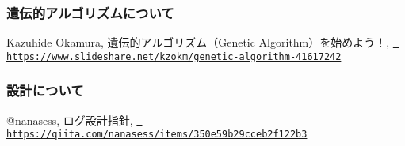 \subsubsection*{遺伝的アルゴリズムについて}

Kazuhide Okamura, 遺伝的アルゴリズム（\+Genetic Algorithm）を始めよう！, \href{https://www.slideshare.net/kzokm/genetic-algorithm-41617242}{\texttt{ https\+://www.\+slideshare.\+net/kzokm/genetic-\/algorithm-\/41617242}}

\subsubsection*{設計について}

@nanasess, ログ設計指針, \href{https://qiita.com/nanasess/items/350e59b29cceb2f122b3}{\texttt{ https\+://qiita.\+com/nanasess/items/350e59b29cceb2f122b3}} 